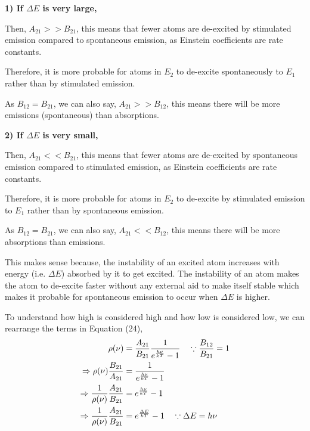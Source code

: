 \documentclass[12pt]{article}
\begin{document}
\begin{block}
    \textbf{1) If $\Delta E$ is very large,}

    \begin{block}
        Then, $A_{21} >> B_{21}$, this means that fewer atoms are de-excited by stimulated emission compared to spontaneous emission, as Einstein coefficients are rate constants. \vspace{.2cm}

        Therefore, it is more probable for atoms in $E_{2}$ to de-excite spontaneously to $E_{1}$ rather than by stimulated emission. \vspace{.2cm}

        As $B_{12} = B_{21}$, we can also say, $A_{21} >> B_{12}$, this means there will be more emissions (spontaneous) than absorptions.
    \end{block} \vspace{.2cm}

    \textbf{2) If $\Delta E$ is very small,}

    \begin{block}
        Then, $A_{21} << B_{21}$, this means that fewer atoms are de-excited by spontaneous emission compared to stimulated emission, as Einstein coefficients are rate constants. \vspace{.2cm}

        Therefore, it is more probable for atoms in $E_{2}$ to de-excite by stimulated emission to $E_{1}$ rather than by spontaneous emission. \vspace{.2cm}

        As $B_{12} = B_{21}$, we can also say, $A_{21} << B_{12}$, this means there will be more absorptions than emissions.
    \end{block}
\end{block} \vspace{.3cm}

This makes sense because, the instability of an excited atom increases with energy (i.e. $\Delta E$) absorbed by it to get excited. The instability of an atom makes the atom to de-excite faster without any external aid to make itself stable which makes it probable for spontaneous emission to occur when $\Delta E$ is higher. \vspace{.2cm}

To understand how high is considered high and how low is considered low, we can rearrange the terms in Equation (24),
\begin{align}
    \rho(\nu) & = \frac{A_{21}}{B_{21}} \frac{1}{e^\frac{h\nu}{kT} - 1} \quad \because \frac{B_{12}}{B_{21}} = 1 \notag \\
    \Rightarrow \rho(\nu) \frac{B_{21}}{A_{21}} & = \frac{1}{e^\frac{h\nu}{kT} - 1} \notag \\
    \Rightarrow \frac{1}{\rho(\nu)} \frac{A_{21}}{B_{21}} & = e^\frac{h\nu}{kT} - 1 \notag \\
    \Rightarrow \frac{1}{\rho(\nu)} \frac{A_{21}}{B_{21}} & = e^\frac{\Delta E}{kT} - 1 \quad \because \Delta E = h\nu
\end{align} \vspace{.2cm}
\end{document}
